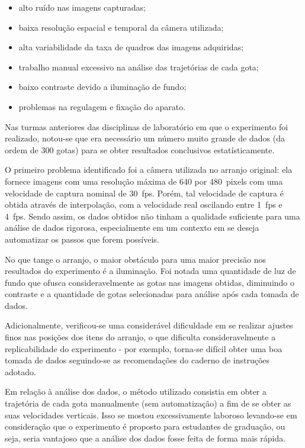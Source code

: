 \documentclass[twoside, twocolumn]{article}
\begin{document}
\begin{itemize}
  \item alto ruído nas imagens capturadas;
  \item baixa resolução espacial e temporal da câmera utilizada;
  \item alta variabilidade da taxa de quadros das imagens adquiridas;
  \item trabalho manual excessivo na análise das trajetórias de cada gota;
  \item baixo contraste devido a iluminação de fundo;
  \item problemas na regulagem e fixação do aparato.
\end{itemize}

Nas turmas anteriores das disciplinas de laboratório em que o experimento foi realizado, notou-se que era necessário um número muito grande de dados (da ordem de 300 gotas) para se obter resultados conclusivos estatísticamente.

O primeiro problema identificado foi a câmera utilizada no arranjo original: ela fornece imagens com uma resolução máxima de \num{640} por \SI{480}{pixels} com uma velocidade de captura nominal de \SI{30}{fps}. Porém, tal velocidade de captura é obtida através de interpolação, com a velocidade real oscilando entre \SI{1}{fps} e \SI{4}{fps}. Sendo assim, os dados obtidos não tinham a qualidade suficiente para uma análise de dados rigorosa, especialmente em um contexto em se deseja automatizar os passos que forem possíveis.

No que tange o arranjo, o maior obstáculo para uma maior precisão nos resultados do experimento é a iluminação. Foi notada uma quantidade de luz de fundo que ofusca consideravelmente as gotas nas imagens obtidas, diminuindo o contraste e a quantidade de gotas selecionadas para análise após cada tomada de dados.

Adicionalmente, verificou-se uma considerável dificuldade em se realizar ajustes finos nas posições dos itens do arranjo, o que dificulta consideravelmente a replicabilidade do experimento - por exemplo, torna-se difícil obter uma boa tomada de dados seguindo-se as recomendações do caderno de instruções adotado.

Em relação à análise dos dados, o método utilizado consistia em obter a trajetória de cada gota manualmente (sem automatização) a fim de se obter as suas velocidades verticais. Isso se mostou excessivamente laboroso levando-se em consideração que o experimento é proposto para estudantes de graduação, ou seja, seria vantajoso que a análise dos dados fosse feita de forma mais rápida.
\end{document}
